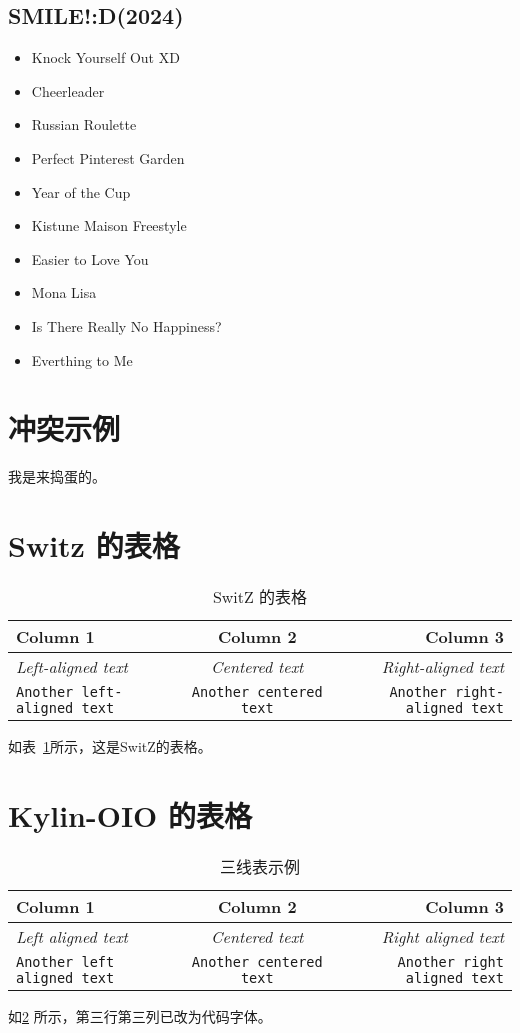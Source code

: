 \documentclass{article}
\begin{document}
\subsection{SMILE!:D(2024)}
\begin{itemize}
    \item Knock Yourself Out XD
    \item Cheerleader
    \item Russian Roulette
    \item Perfect Pinterest Garden
    \item Year of the Cup
    \item Kistune Maison Freestyle
    \item Easier to Love You
    \item Mona Lisa
    \item Is There Really No Happiness?
    \item Everthing to Me
\end{itemize}

    \section{冲突示例}

    我是来捣蛋的。

    \section{ Switz 的表格}
    \begin{table}[h]
        \centering
        \begin{tabular}{lcr}
            \toprule
            \textbf{Column 1} & \textbf{Column 2} & \textbf{Column 3} \\
            \midrule
            \textit{Left-aligned text} & \textit{Centered text} & \textit{Right-aligned text} \\
            \texttt{Another left-aligned text} & \texttt{Another centered text} & \texttt{Another right-aligned text} \\
            \bottomrule
        \end{tabular}
        \caption{SwitZ 的表格}
        \label{tab:switz}
    \end{table}
    如表~\ref{tab:switz}所示，这是SwitZ的表格。
    \section{ Kylin-OIO 的表格}
    \begin{table}[]
        \centering
        \begin{tabular}{l c r} 
        \hline
          Column 1 & Column 2 & Column 3 \\
          \hline
           \textit{Left aligned text}  & \textit{Centered text} & \textit{Right aligned text} \\
           \texttt{Another left aligned text} & \texttt{Another centered text} & \texttt{Another right aligned text}\\
           \hline
        \end{tabular}
        \caption{三线表示例}
        \label{tab:my_table}
    \end{table}
    
    如\ref{tab:my_table} 所示，第三行第三列已改为代码字体。
\end{document}
